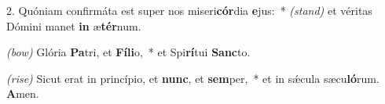 2. Quóniam confirmáta est super nos miseri\textbf{cór}dia \textbf{e}jus:~* {\color{red}\textit{(stand)}} et véritas Dómini manet \textbf{in} æ\textbf{tér}num.

{\color{red}\textit{(bow)}} Glória \textbf{Pa}tri, et \textbf{Fí}\textbf{li}o,~* et Spi\textbf{rí}tui \textbf{Sanc}to.

{\color{red}\textit{(rise)}} Sicut erat in princípio, et \textbf{nunc}, et \textbf{sem}per,~* et in s\'{\ae}cula sæcu\textbf{ló}rum. \textbf{A}men.